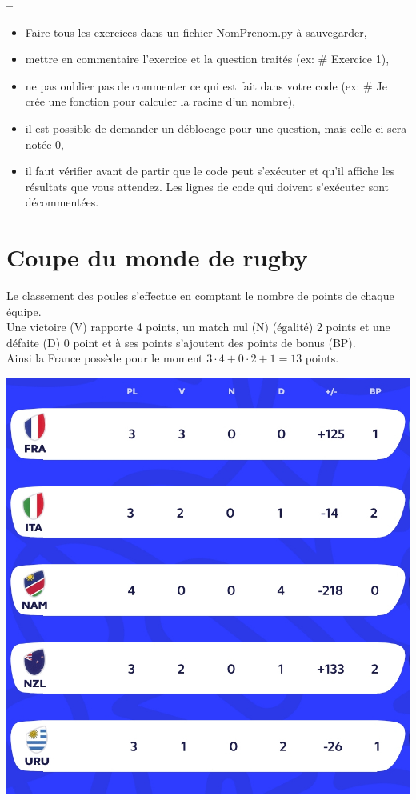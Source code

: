 

\begin{center}
{\Large\bf {\type} \no {\numero} -- \descrip}
\end{center}


\begin{boxedminipage}{.9\textwidth} 
\begin{itemize}
 \item Faire tous les exercices dans un fichier {NomPrenom.py} à sauvegarder,
 \item mettre en commentaire l'exercice et la question traités (ex: \# Exercice 1),
 \item ne pas oublier pas de commenter ce qui est fait dans votre code (ex: \# Je crée une fonction pour calculer la racine d'un nombre),
 \item il est possible de demander un déblocage pour une question, mais celle-ci sera notée 0,
 \item il faut vérifier avant de partir que le code peut s'exécuter et qu'il affiche les résultats que vous attendez. Les lignes de code qui doivent s'exécuter sont décommentées.
\end{itemize}
\end{boxedminipage}

\section{Coupe du monde de rugby}

\begin{minipage}{0.6\linewidth}
Le classement des poules s'effectue en comptant le nombre de points de chaque équipe.\\ Une victoire (V) rapporte 4 points, un match nul (N) (égalité) 2 points et une défaite (D) 0 point et à ses points s'ajoutent des points de bonus (BP).\\
Ainsi la France possède pour le moment $3\cdot 4+0\cdot 2+1=13$ points.
\end{minipage}\hfill
\begin{minipage}{0.35\linewidth}
\centering\includegraphics[width=0.7\linewidth]{img/groupe_A}
\end{minipage}

